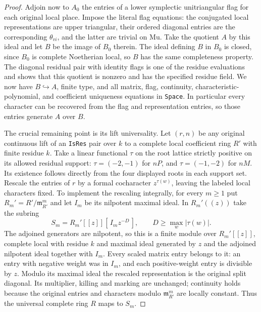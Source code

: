 \begin{proof}
Adjoin now to $A_0$ the entries of a lower symplectic
unitriangular flag for each original local place.
Impose the literal flag equations: the conjugated
local representations are upper triangular, their ordered
diagonal entries are the corresponding $\theta_{vi}$,
and the latter are trivial on $\mathrm{Mu}$. Take the
quotient $A$ by this ideal and let $B$ be the image of
$B_0$ therein. The ideal defining $B$ in $B_0$ is closed,
since $B_0$ is complete Noetherian local, so $B$ has
the same completeness property. The diagonal residual
pair with identity flags is one of the residue
evaluations and shows that this quotient is nonzero
and has the specified residue field. We now have
$B\hookrightarrow A$, finite type, and all matrix,
flag, continuity, characteristic-polynomial, and
coefficient uniqueness equations in \texttt{Space}.
In particular every character can be recovered from
the flag and representation entries, so those entries
generate $A$ over $B$.

The crucial remaining point is its lift universality.
Let $(r,n)$ be any original continuous lift of an
\texttt{IsRes} pair over $k$ to a complete local
coefficient ring $R'$ with finite residue $k$.
Take a linear functional $\tau$ on the root lattice
strictly positive on its allowed residual support:
$\tau=(-2,-1)$ for $nP$, and $\tau=(-1,-2)$
for $nM$. Its existence follows directly from the
four displayed roots in each support set.
Rescale the entries of $r$ by a formal cocharacter
$z^{\tau(w)}$, leaving the labeled local characters
fixed. To implement the rescaling integrally, for
every $m\ge1$ put $R_m'=R'/\mathfrak m_{R'}^m$ and
let $I_m$ be its nilpotent maximal ideal. In
$R_m'((z))$ take the subring
\[
      S_m=R_m'[[z]][\, I_m z^{-D}\,],
      \qquad D\ge \max_w|\tau(w)|.
\]
The adjoined generators are nilpotent, so this
is a finite module over $R_m'[[z]]$, complete local
with residue $k$ and maximal ideal generated by
$z$ and the adjoined nilpotent ideal together with
$I_m$. Every scaled matrix entry belongs to it:
an entry with negative weight was in $I_m$,
and each positive-weight entry is divisible by $z$.
Modulo its maximal ideal the rescaled representation
is the original split diagonal. Its multiplier,
killing and marking are unchanged; continuity holds
because the original entries and characters modulo
$\mathfrak m_{R'}^m$ are locally constant.
Thus the universal complete ring $R$ maps to $S_m$.


\end{proof}
